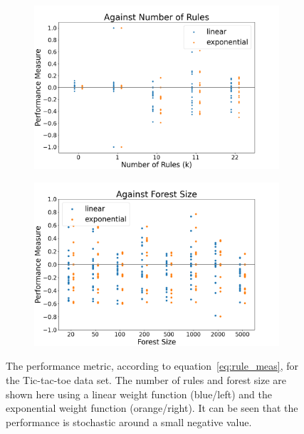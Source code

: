 \documentclass[11pt]{article}
\begin{document}
\begin{figure}[ht]
\centering
\begin{subfigure}{0.49\textwidth}
\includegraphics[width = \textwidth]{images/rules_performance_meas.png}
\end{subfigure}
\hfill
\begin{subfigure}{0.49\textwidth}
\includegraphics[width = \textwidth]{images/forest_performance_meas.png}
\end{subfigure}
\caption{The performance metric, according to equation~\ref{eq:rule_meas}, for the Tic-tac-toe data set. The number of rules and forest size are shown here using a linear weight function (blue/left) and the exponential weight function (orange/right). It can be seen that the performance is stochastic around a small negative value.}
\label{fig:quant_stat}
\end{figure}
\end{document}
